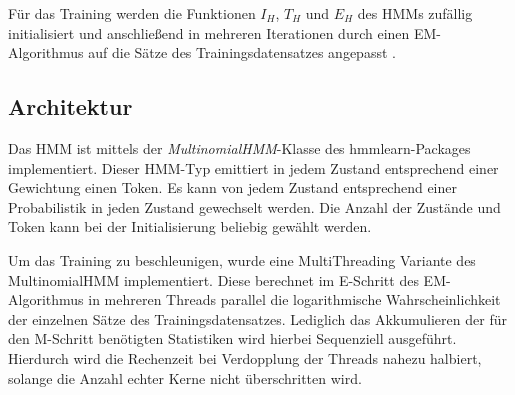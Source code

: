 \documentclass[conference]{IEEEtran}
\begin{document}
Für das Training werden die Funktionen $I_H$, $T_H$ und $E_H$ des HMMs zufällig initialisiert und anschließend in mehreren Iterationen durch einen EM-Algorithmus auf die Sätze des Trainingsdatensatzes angepasst \cite{hmmTraining}.

\subsection{Architektur}
Das HMM ist mittels der \textit{MultinomialHMM}-Klasse des hmmlearn-Packages \cite{hmmlearn} implementiert. 
Dieser HMM-Typ emittiert in jedem Zustand entsprechend einer Gewichtung einen Token.
Es kann von jedem Zustand entsprechend einer Probabilistik in jeden Zustand gewechselt werden.
Die Anzahl der Zustände und Token kann bei der Initialisierung beliebig gewählt werden.%

Um das Training zu beschleunigen, wurde eine MultiThreading Variante des MultinomialHMM implementiert.
Diese berechnet im E-Schritt des EM-Algorithmus in mehreren Threads parallel die logarithmische Wahrscheinlichkeit der einzelnen Sätze des Trainingsdatensatzes.
Lediglich das Akkumulieren der für den M-Schritt benötigten Statistiken wird hierbei Sequenziell ausgeführt.
Hierdurch wird die Rechenzeit bei Verdopplung der Threads nahezu halbiert, solange die Anzahl echter Kerne nicht überschritten wird.
\end{document}
